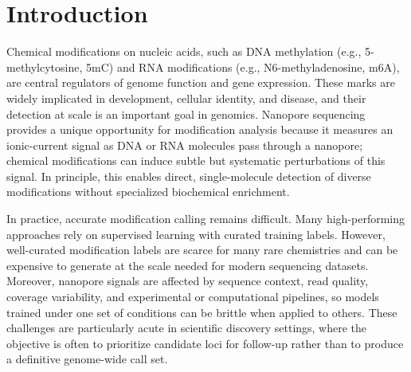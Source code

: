\documentclass[sigconf, review]{acmart}
\begin{document}


\received[revised]{}
\received[accepted]{}

\maketitle

\section{Introduction}
Chemical modifications on nucleic acids, such as DNA methylation (e.g., 5-methylcytosine, 5mC) and RNA modifications (e.g., N6-methyladenosine, m6A), are central regulators of genome function and gene expression\cite{ref1}. These marks are widely implicated in development, cellular identity, and disease, and their detection at scale is an important goal in genomics. Nanopore sequencing provides a unique opportunity for modification analysis because it measures an ionic-current signal as DNA or RNA molecules pass through a nanopore; chemical modifications can induce subtle but systematic perturbations of this signal. In principle, this enables direct, single-molecule detection of diverse modifications without specialized biochemical enrichment.

In practice, accurate modification calling remains difficult. Many high-performing approaches rely on supervised learning with curated training labels. However, well-curated modification labels are scarce for many rare chemistries and can be expensive to generate at the scale needed for modern sequencing datasets. Moreover, nanopore signals are affected by sequence context, read quality, coverage variability, and experimental or computational pipelines, so models trained under one set of conditions can be brittle when applied to others. These challenges are particularly acute in scientific discovery settings, where the objective is often to prioritize candidate loci for follow-up rather than to produce a definitive genome-wide call set.
\end{document}

